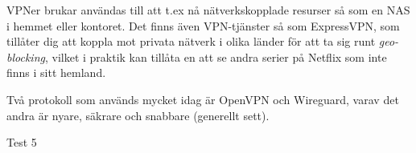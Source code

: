 VPNer brukar användas till att t.ex nå nätverkskopplade resurser så som en NAS i hemmet eller kontoret. Det finns även VPN-tjänster så som ExpressVPN, som tillåter dig att koppla mot privata nätverk i olika länder för att ta sig runt \textit{geo-blocking}, vilket i praktik kan tillåta en att se andra serier på Netflix som inte finns i sitt hemland.

Två protokoll som används mycket idag är OpenVPN och Wireguard, varav det andra är nyare, säkrare och snabbare (generellt sett).

Test 5
















